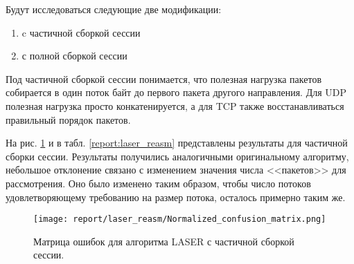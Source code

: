 Будут исследоваться следующие две модификации:

\begin{enumerate}
    \item c частичной сборкой сессии
    \item с полной сборкой сессии
\end{enumerate}

Под частичной сборкой сессии понимается, что полезная нагрузка пакетов собирается в один поток байт до первого пакета другого направления.
Для UDP полезная нагрузка просто конкатенируется, а для TCP также восстанавливаться правильный порядок пакетов.

На рис. \ref{matrix:laser_reasm} и в табл. \ref{report:laser_reasm} представлены результаты для частичной сборки сессии.
Результаты получились аналогичными оригинальному алгоритму,
небольшое отклонение связано с изменением значения числа <<пакетов>> для рассмотрения.
Оно было изменено таким образом, чтобы число потоков удовлетворяющему требованию на размер потока, осталось примерно таким же.

\begin{figure}[H]
    \begin{center}
        \texttt{[image: report/laser\_reasm/Normalized\_confusion\_matrix.png]}
        \caption{Матрица ошибок для алгоритма LASER с частичной сборкой сессии.}
        \label{matrix:laser_reasm}
    \end{center}
\end{figure}

